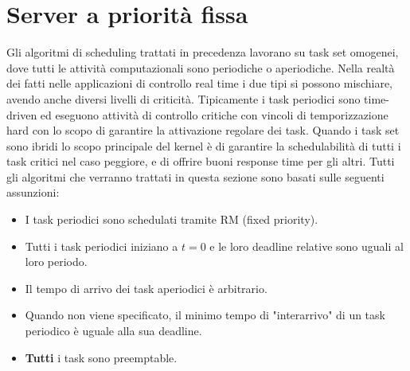 \documentclass[12pt,openany,onesided]{book}
\begin{document}
\chapter{Server a priorità fissa}
Gli algoritmi di scheduling trattati in precedenza lavorano su task set omogenei, dove tutti le attività computazionali sono periodiche o aperiodiche.
Nella realtà dei fatti nelle applicazioni di controllo real time i due tipi si possono mischiare, avendo anche diversi livelli di criticità.
Tipicamente i task periodici sono time-driven ed eseguono attività di controllo critiche con vincoli di temporizzazione hard con lo scopo di garantire la attivazione regolare dei task.
Quando i task set sono ibridi lo scopo principale del kernel è di garantire la schedulabilità di tutti i task critici nel caso peggiore, e di offrire buoni response time per gli altri.
Tutti gli algoritmi che verranno trattati in questa sezione sono basati sulle seguenti assunzioni:
\begin{itemize}
    \item I task periodici sono schedulati tramite RM (fixed priority).
    \item Tutti i task periodici iniziano a $t=0$ e le loro deadline relative sono uguali al loro periodo.
    \item Il tempo di arrivo dei task aperiodici è arbitrario.
    \item Quando non viene specificato, il minimo tempo di "interarrivo" di un task periodico è uguale alla sua deadline.
    \item \textbf{Tutti} i task sono preemptable.
\end{itemize}
\end{document}
